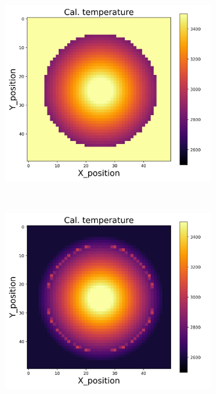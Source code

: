 {\begin{figure}[h]
\begin{minipage}{\textwidth}
\begin{subfigure}{0.27\textwidth}
        \end{subfigure}
        \begin{subfigure}{0.27\textwidth}
            \centering
            \includegraphics[width=\textwidth]{figures/raw_data/21/T3500/linear/T_cal.jpg}
        \end{subfigure}
    \end{minipage}\\
    \begin{minipage}{\textwidth}
        \centering
        \begin{subfigure}{0.27\textwidth}
            \centering
            \includegraphics[width=\textwidth]{figures/raw_data/22/T3500/linear/T_cal.jpg}

\end{subfigure}
\end{minipage}
\end{figure}}

